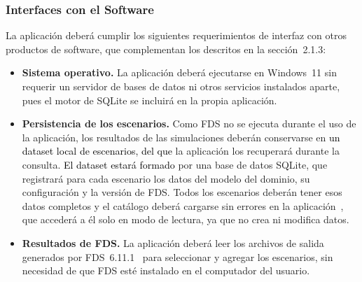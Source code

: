 \subsubsection{Interfaces con el Software}\label{sec:interfaces-software}
La aplicación deberá cumplir los siguientes requerimientos de interfaz con otros productos de software, que complementan los descritos en la sección~2.1.3:

\begin{itemize}
  \item \textbf{Sistema operativo.} La aplicación deberá ejecutarse en Windows~11 sin requerir un servidor de bases de datos ni otros servicios instalados aparte, pues el motor de SQLite se incluirá en la propia aplicación.
  \item \textbf{Persistencia de los escenarios.} Como FDS no se ejecuta durante el uso de la aplicación, los resultados de las simulaciones deberán conservarse en \textcolor{black}{un dataset local de escenarios, del que} la aplicación los recuperará durante la consulta. \textcolor{black}{El dataset estará formado} por una base de datos SQLite, que registrará para cada escenario los datos del modelo del dominio, su configuración y la versión de FDS. Todos los escenarios deberán tener esos datos completos y el catálogo deberá cargarse sin errores en la aplicación~\cite{pmp2026}, que accederá a él solo en modo de lectura, ya que no crea ni modifica datos.
  \item \textbf{Resultados de FDS.} La aplicación deberá leer los archivos de salida generados por FDS~6.11.1~\cite{fdsguide} para seleccionar y agregar los escenarios, sin necesidad de que FDS esté instalado en el computador del usuario.
\end{itemize}